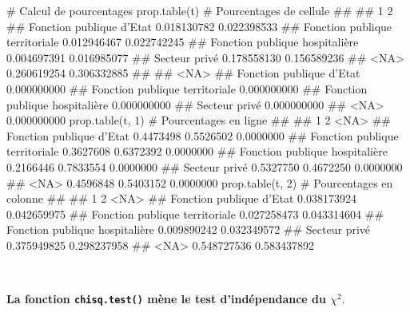 \documentclass[12pt,twosided, notitlepage]{book}
\newenvironment{Shaded}{}{}
\newcommand{\KeywordTok}[1]{\textcolor[rgb]{0.00,0.00,1.00}{#1}}
\newcommand{\DecValTok}[1]{#1}
\newcommand{\CommentTok}[1]{\textcolor[rgb]{0.00,0.50,0.00}{#1}}
\newcommand{\NormalTok}[1]{#1}
\renewenvironment{Shaded}{\begin{snugshade}}{\end{snugshade}}
\begin{document}
\begin{Shaded}
\begin{Highlighting}[]
\CommentTok{# Calcul de pourcentages}
\KeywordTok{prop.table}\NormalTok{(t) }\CommentTok{# Pourcentages de cellule}
\NormalTok{  ##                                 }
\NormalTok{  ##                                            1           2}
\NormalTok{  ##   Fonction publique d'Etat       0.018130782 0.022398533}
\NormalTok{  ##   Fonction publique territoriale 0.012946467 0.022742245}
\NormalTok{  ##   Fonction publique hospitalière 0.004697391 0.016985077}
\NormalTok{  ##   Secteur privé                  0.178558130 0.156589236}
\NormalTok{  ##   <NA>                           0.260619254 0.306332885}
\NormalTok{  ##                                 }
\NormalTok{  ##                                         <NA>}
\NormalTok{  ##   Fonction publique d'Etat       0.000000000}
\NormalTok{  ##   Fonction publique territoriale 0.000000000}
\NormalTok{  ##   Fonction publique hospitalière 0.000000000}
\NormalTok{  ##   Secteur privé                  0.000000000}
\NormalTok{  ##   <NA>                           0.000000000}
\KeywordTok{prop.table}\NormalTok{(t, }\DecValTok{1}\NormalTok{) }\CommentTok{# Pourcentages en ligne}
\NormalTok{  ##                                 }
\NormalTok{  ##                                          1         2      <NA>}
\NormalTok{  ##   Fonction publique d'Etat       0.4473498 0.5526502 0.0000000}
\NormalTok{  ##   Fonction publique territoriale 0.3627608 0.6372392 0.0000000}
\NormalTok{  ##   Fonction publique hospitalière 0.2166446 0.7833554 0.0000000}
\NormalTok{  ##   Secteur privé                  0.5327750 0.4672250 0.0000000}
\NormalTok{  ##   <NA>                           0.4596848 0.5403152 0.0000000}
\KeywordTok{prop.table}\NormalTok{(t, }\DecValTok{2}\NormalTok{) }\CommentTok{# Pourcentages en colonne}
\NormalTok{  ##                                 }
\NormalTok{  ##                                            1           2 <NA>}
\NormalTok{  ##   Fonction publique d'Etat       0.038173924 0.042659975     }
\NormalTok{  ##   Fonction publique territoriale 0.027258473 0.043314604     }
\NormalTok{  ##   Fonction publique hospitalière 0.009890242 0.032349572     }
\NormalTok{  ##   Secteur privé                  0.375949825 0.298237958     }
\NormalTok{  ##   <NA>                           0.548727536 0.583437892}
\end{Highlighting}
\end{Shaded}

~

\textbf{La fonction \texttt{chisq.test()} mène le test d'indépendance du
\(\chi^2\)}.
\end{document}
